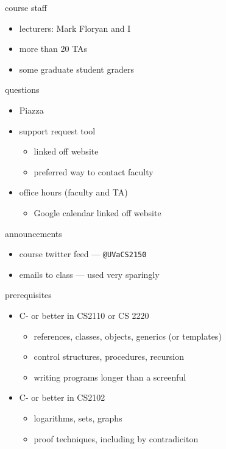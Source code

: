 \begin{frame}{course staff}
    \begin{itemize}
        \item lecturers: Mark Floryan and I
        \item more than 20 TAs
        \item some graduate student graders
    \end{itemize}
\end{frame}

\begin{frame}{questions}
    \begin{itemize}
    \item Piazza 
    \item support request tool
        \begin{itemize}
        \item linked off website
        \item preferred way to contact faculty
        \end{itemize}
    \item office hours (faculty and TA)
        \begin{itemize}
        \item Google calendar linked off website
        \end{itemize}
    \end{itemize}
\end{frame}

\begin{frame}{announcements}
    \begin{itemize}
    \item course twitter feed --- \texttt{@UVaCS2150}
    \item emails to class --- used very sparingly
    \end{itemize}
\end{frame}

\begin{frame}{prerequisites}
    \begin{itemize}
        \item C- or better in CS2110 or CS 2220
            \begin{itemize}
            \item references, classes, objects, generics (or templates)
            \item control structures, procedures, recursion
            \item writing programs longer than a screenful
            \end{itemize}
        \item C- or better in CS2102
            \begin{itemize}
            \item logarithms, sets, graphs
            \item proof techniques, including by contradiciton
            \end{itemize}
    \end{itemize}
\end{frame}

